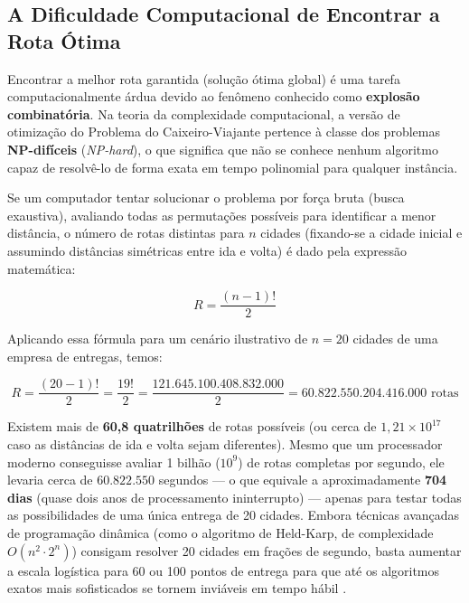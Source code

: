 \subsection{A Dificuldade Computacional de Encontrar a Rota Ótima}

Encontrar a melhor rota garantida (solução ótima global) é uma tarefa computacionalmente árdua devido ao fenômeno conhecido como \textbf{explosão combinatória}. Na teoria da complexidade computacional, a versão de otimização do Problema do Caixeiro-Viajante pertence à classe dos problemas \textbf{NP-difíceis} (\textit{NP-hard}), o que significa que não se conhece nenhum algoritmo capaz de resolvê-lo de forma exata em tempo polinomial para qualquer instância.

Se um computador tentar solucionar o problema por força bruta (busca exaustiva), avaliando todas as permutações possíveis para identificar a menor distância, o número de rotas distintas para $n$ cidades (fixando-se a cidade inicial e assumindo distâncias simétricas entre ida e volta) é dado pela expressão matemática:

\begin{equation}
    R = \frac{(n - 1)!}{2}
\end{equation}

Aplicando essa fórmula para um cenário ilustrativo de $n = 20$ cidades de uma empresa de entregas, temos:

\begin{equation}
    R = \frac{(20 - 1)!}{2} = \frac{19!}{2} = \frac{121.645.100.408.832.000}{2} = 60.822.550.204.416.000\text{ rotas}
\end{equation}

Existem mais de \textbf{60,8 quatrilhões} de rotas possíveis (ou cerca de $1,21 \times 10^{17}$ caso as distâncias de ida e volta sejam diferentes). Mesmo que um processador moderno conseguisse avaliar 1 bilhão ($10^9$) de rotas completas por segundo, ele levaria cerca de $60.822.550$ segundos --- o que equivale a aproximadamente \textbf{704 dias} (quase dois anos de processamento ininterrupto) --- apenas para testar todas as possibilidades de uma única entrega de 20 cidades. Embora técnicas avançadas de programação dinâmica (como o algoritmo de Held-Karp, de complexidade $O(n^2 \cdot 2^n)$) consigam resolver 20 cidades em frações de segundo, basta aumentar a escala logística para 60 ou 100 pontos de entrega para que até os algoritmos exatos mais sofisticados se tornem inviáveis em tempo hábil \cite{feofiloff_caixeiro}.

